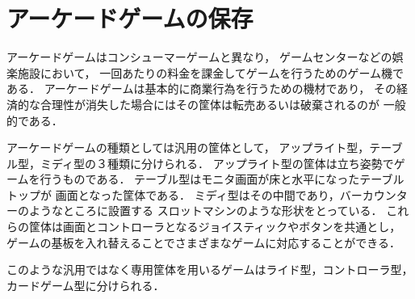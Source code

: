 \section{アーケードゲームの保存}
\label{sec:arcade}

アーケードゲームはコンシューマーゲームと異なり，
ゲームセンターなどの娯楽施設において，
一回あたりの料金を課金してゲームを行うためのゲーム機である．
アーケードゲームは基本的に商業行為を行うための機材であり，
その経済的な合理性が消失した場合にはその筐体は転売あるいは破棄されるのが
一般的である．

アーケードゲームの種類としては汎用の筐体として，
アップライト型，テーブル型，ミディ型の３種類に分けられる．
アップライト型の筐体は立ち姿勢でゲームを行うものである．
テーブル型はモニタ画面が床と水平になったテーブルトップが
画面となった筐体である．
ミディ型はその中間であり，バーカウンターのようなところに設置する
スロットマシンのような形状をとっている．
これらの筐体は画面とコントローラとなるジョイスティックやボタンを共通とし，
ゲームの基板を入れ替えることでさまざまなゲームに対応することができる．


このような汎用ではなく専用筐体を用いるゲームはライド型，コントローラ型，
カードゲーム型に分けられる．

